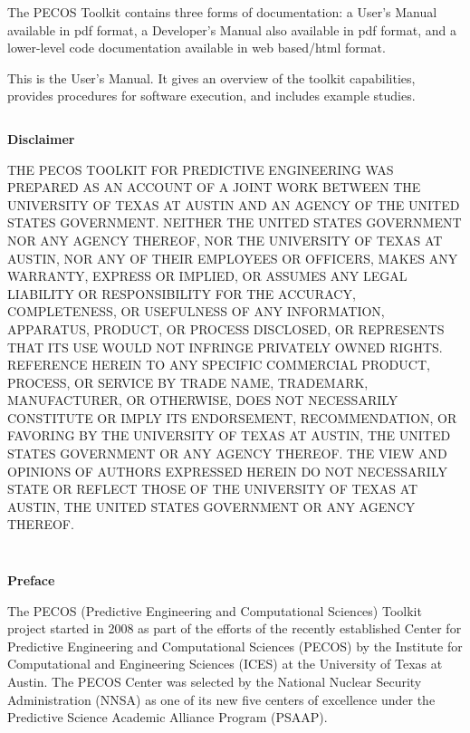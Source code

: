 The PECOS Toolkit contains three forms of documentation:
a User's Manual available in pdf format,
a Developer's Manual also available in pdf format, and
a lower-level code documentation available in web based/html format.

This is the User's Manual.
It gives an overview of the toolkit capabilities,
provides procedures for software execution, and includes example studies.

\clearpage
$~$\\

\clearpage
\centerline{\Large\bf Disclaimer}
$~$\\
    THE PECOS TOOLKIT FOR PREDICTIVE ENGINEERING WAS PREPARED AS AN ACCOUNT OF A JOINT WORK
    BETWEEN THE UNIVERSITY OF TEXAS AT AUSTIN AND AN AGENCY OF THE UNITED STATES GOVERNMENT.
    NEITHER THE UNITED STATES GOVERNMENT NOR ANY AGENCY THEREOF, NOR THE UNIVERSITY OF TEXAS
    AT AUSTIN, NOR ANY OF THEIR EMPLOYEES OR OFFICERS, MAKES ANY WARRANTY, EXPRESS OR IMPLIED,
    OR ASSUMES ANY LEGAL LIABILITY OR RESPONSIBILITY FOR THE ACCURACY, COMPLETENESS, OR
    USEFULNESS OF ANY INFORMATION, APPARATUS, PRODUCT, OR PROCESS DISCLOSED, OR REPRESENTS
    THAT ITS USE WOULD NOT INFRINGE PRIVATELY OWNED RIGHTS. REFERENCE HEREIN TO ANY SPECIFIC
    COMMERCIAL PRODUCT, PROCESS, OR SERVICE BY TRADE NAME, TRADEMARK, MANUFACTURER, OR OTHERWISE,
    DOES NOT NECESSARILY CONSTITUTE OR IMPLY ITS ENDORSEMENT, RECOMMENDATION, OR FAVORING BY
    THE UNIVERSITY OF TEXAS AT AUSTIN, THE UNITED STATES GOVERNMENT OR ANY AGENCY THEREOF.
    THE VIEW AND OPINIONS OF AUTHORS EXPRESSED HEREIN DO NOT NECESSARILY STATE OR REFLECT
    THOSE OF THE UNIVERSITY OF TEXAS AT AUSTIN, THE UNITED STATES GOVERNMENT OR ANY AGENCY
    THEREOF.

\clearpage
$~$\\

\clearpage
{\markboth{}{}
}
\tableofcontents

\clearpage
$~$\\

\clearpage
\thispagestyle{empty}
\centerline{\Large\bf Preface}
$~$\\
The PECOS (Predictive Engineering and Computational Sciences) Toolkit project started in 2008 as part
of the efforts of the recently established Center for Predictive Engineering and Computational Sciences (PECOS)
by the Institute for Computational and Engineering Sciences (ICES) at the University of Texas at Austin.
The PECOS Center was selected by the National Nuclear Security Administration (NNSA) as one of its new five centers of excellence
under the Predictive Science Academic Alliance Program (PSAAP).

